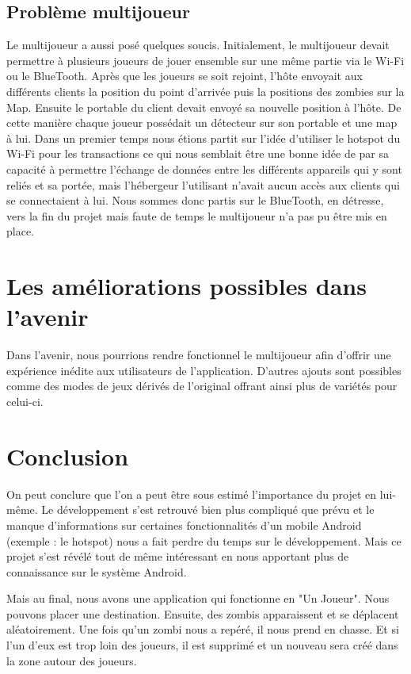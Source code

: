 \documentclass{article}
\begin{document}
\subsection{Problème multijoueur}

Le multijoueur a aussi posé quelques soucis. 
Initialement, le multijoueur devait permettre à plusieurs joueurs de jouer ensemble sur une même partie via le Wi-Fi ou le BlueTooth. Après que les joueurs se soit rejoint, l'hôte envoyait aux différents clients la position du point d'arrivée puis la positions des zombies sur la Map. Ensuite le portable du client devait envoyé sa nouvelle position à l'hôte. De cette manière chaque joueur possédait un détecteur sur son portable et une map à lui.    
Dans un premier temps nous étions partit sur l'idée d'utiliser le hotspot du Wi-Fi pour les transactions ce qui nous semblait être une bonne idée de par sa capacité à permettre l'échange de données entre les différents appareils qui y sont reliés et sa portée,
mais l'hébergeur l'utilisant n'avait aucun accès aux clients qui se connectaient à lui.
Nous sommes donc partis sur le BlueTooth, en détresse, vers la fin du projet mais faute de temps le multijoueur n'a pas pu être mis en place.

\newpage

\section{Les améliorations possibles dans l'avenir}


Dans l'avenir, nous pourrions rendre fonctionnel le multijoueur afin d'offrir une expérience inédite aux utilisateurs de l'application. D'autres ajouts sont possibles comme des modes de jeux dérivés de l'original offrant ainsi plus de variétés pour celui-ci. 


\section{Conclusion}

On peut conclure que l'on a peut être sous estimé l'importance du projet en lui-même. Le développement s'est retrouvé bien plus compliqué que prévu et le manque d'informations sur certaines fonctionnalités d'un mobile Android (exemple : le hotspot) nous a fait perdre du temps sur le développement. Mais ce projet s'est révélé tout de même intéressant en nous apportant plus de connaissance sur le système Android.

Mais au final, nous avons une application qui fonctionne en "Un Joueur".
Nous pouvons placer une destination. Ensuite, des zombis apparaissent et se déplacent aléatoirement.
Une fois qu'un zombi nous a repéré, il nous prend en chasse.
Et si l'un d'eux est trop loin des joueurs, il est supprimé et un nouveau sera créé dans la zone autour des joueurs.
  
\end{document}
